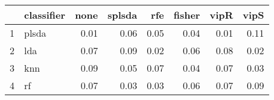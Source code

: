 \begin{table}[ht]
\centering
\begin{tabular}{rlrrrrrr}
  \hline
 & classifier & none & splsda & rfe & fisher & vipR & vipS \\ 
  \hline
1 & plsda & 0.01 & 0.06 & 0.05 & 0.04 & 0.01 & 0.11 \\ 
  2 & lda & 0.07 & 0.09 & 0.02 & 0.06 & 0.08 & 0.02 \\ 
  3 & knn & 0.09 & 0.05 & 0.07 & 0.04 & 0.07 & 0.03 \\ 
  4 & rf & 0.07 & 0.03 & 0.03 & 0.06 & 0.07 & 0.09 \\ 
   \hline
\end{tabular}
\end{table}
